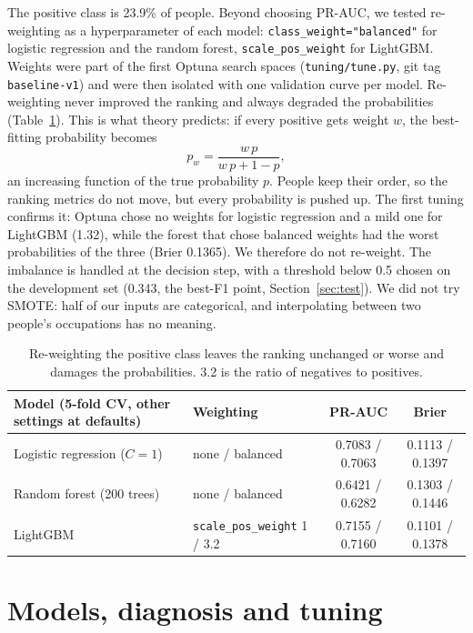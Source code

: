 \documentclass[11pt,a4paper]{article}
\newcommand{\code}[1]{\texttt{#1}}
\begin{document}
The positive class is 23.9\% of people. Beyond choosing PR-AUC, we tested re-weighting as a hyperparameter of each model: \code{class\_weight="balanced"} for logistic regression and the random forest, \code{scale\_pos\_weight} for LightGBM. Weights were part of the first Optuna search spaces (\code{tuning/tune.py}, git tag \code{baseline-v1}) and were then isolated with one validation curve per model. Re-weighting never improved the ranking and always degraded the probabilities (Table~\ref{tab:imbalance}). This is what theory predicts: if every positive gets weight $w$, the best-fitting probability becomes
\begin{equation}
p_w = \frac{w\,p}{w\,p + 1 - p},
\end{equation}
an increasing function of the true probability $p$. People keep their order, so the ranking metrics do not move, but every probability is pushed up. The first tuning confirms it: Optuna chose no weights for logistic regression and a mild one for LightGBM (1.32), while the forest that chose balanced weights had the worst probabilities of the three (Brier 0.1365). We therefore do not re-weight. The imbalance is handled at the decision step, with a threshold below 0.5 chosen on the development set (0.343, the best-F1 point, Section~\ref{sec:test}). We did not try SMOTE: half of our inputs are categorical, and interpolating between two people's occupations has no meaning.

\begin{table}[H]
\centering\small
\begin{tabular}{@{}llcc@{}}
\toprule
Model (5-fold CV, other settings at defaults) & Weighting & PR-AUC & Brier \\
\midrule
Logistic regression ($C=1$) & none / balanced & 0.7083 / 0.7063 & 0.1113 / 0.1397 \\
Random forest (200 trees) & none / balanced & 0.6421 / 0.6282 & 0.1303 / 0.1446 \\
LightGBM & \code{scale\_pos\_weight} 1 / 3.2 & 0.7155 / 0.7160 & 0.1101 / 0.1378 \\
\bottomrule
\end{tabular}
\caption{Re-weighting the positive class leaves the ranking unchanged or worse and damages the probabilities. 3.2 is the ratio of negatives to positives.}
\label{tab:imbalance}
\end{table}

\section{Models, diagnosis and tuning}
\label{sec:models}
\end{document}
